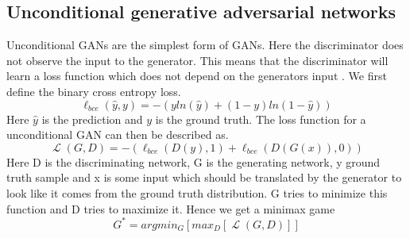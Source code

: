 \documentclass{kththesis}
\DeclareMathOperator{\Lagr}{\mathcal{L}}
\begin{document}
\subsection{Unconditional generative adversarial networks}
Unconditional GANs are the simplest form of GANs. Here the discriminator does not observe the input to the generator. This means that the discriminator will learn a loss function which does not depend on the generators input \parencite{isola_image--image_2016}. We first define the binary cross entropy loss.
\begin{equation}\label{eq:bce}
\ell_{bce}(\hat{y}, y)=-(yln(\hat{y})+(1-y)ln(1-\hat{y}))
\end{equation}
Here $\hat{y}$ is the prediction and $y$ is the ground truth.
The loss function for a unconditional GAN can then be described as.
 \begin{equation}
\Lagr(G, D) = -(\ell_{bce}(D(y), 1) + \ell_{bce}(D(G(x)), 0))
\end{equation}
Here D is the discriminating network, G is the generating network, y ground truth sample and x is some input which should be translated by the generator to look like it comes from the ground truth distribution. G tries to minimize this function and D tries to maximize it. Hence we get a minimax game 
\begin{equation}
G^{*}=argmin_{G}[max_{D}[\Lagr(G, D)]]\label{eq:minimax}
\end{equation}
\end{document}

